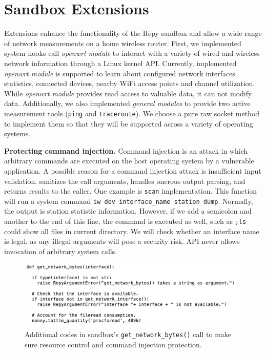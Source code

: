 \section{Sandbox Extensions}
\label{sec.extensions}
Extensions enhance the functionality of the Repy sandbox and allow a wide range of
network measurements on a home wireless router. First, we implemented system hooks
 call \textit{openwrt module} to interact with a variety of wired and wireless
 network information through a Linux kernel API. Currently, implemented
  \textit{openwrt module} is supported to learn about configured network interfaces
   statistics, connected devices, nearby WiFi access points and channel utilization.
   While \textit{openwrt module} provides read access to valuable data, it can not
    modify data. Additionally, we also implemented \textit{general modules} to provide two active measurement tools (\texttt{ping}\cite{pingcode} and \texttt{traceroute}\cite{traceroutecode}). We choose a pure raw socket method to implement them so that they will be supported across a variety of operating systems.

\textbf{Protecting command injection.} Command injection is an attack in which arbitrary
 commands are executed on the host operating system by a vulnerable application.
A possible reason for a command injection attack is insufficient input validation.
\sysname sanitizes the call arguments, handles onerous output parsing, and returns
results to the caller. One example is \texttt{scan} implementation. This function
will run a system command \texttt{iw dev interface\_name station dump}.
Normally, the output is station statistic information. However, if we add a
semicolon and another to the end of this line, the command is executed as well,
 such as \texttt{;ls} could show all files in current directory. We will check
 whether an interface name is legal, as any illegal arguments will pose a security
  risk. \sysname API never allows invocation of arbitrary system calls.

\begin{figure}%
\centering
\includegraphics[width=0.8\columnwidth]{figure/nanny.png}
\caption{Additional codes in \sysname sandbox's \texttt{get\_network\_bytes()} call to make sure resource control and command injection protection.}
\label{fig-nanny}
\end{figure}

